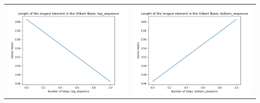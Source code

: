 \documentclass[10pt]{article}
\begin{document}
\begin{tabular}{c|c}
\begin{minipage}{.45\textwidth}
\includegraphics[width=\textwidth]{"DATA/4d/4 generators 2 bound I/top_sequence LENGTH"}
\end{minipage} &
\begin{minipage}{.45\textwidth}
\includegraphics[width=\textwidth]{"DATA/4d/4 generators 2 bound I bottomup/bottom_sequence LENGTH"}
\end{minipage}
\end{tabular}
\end{document}
